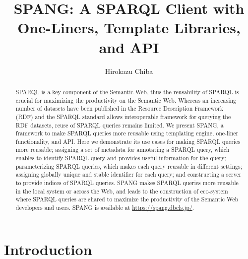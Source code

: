 \documentclass[runningheads]{llncs}
\begin{document}
\title{SPANG: A SPARQL Client with One-Liners, Template Libraries, and API}
\author{Hirokazu Chiba}
%
\maketitle              %
%
\begin{abstract}
SPARQL is a key component of the Semantic Web, thus the reusability of SPARQL is crucial for maximizing the productivity on the Semantic Web.
Whereas an increasing number of datasets have been published in the Resource Description Framework (RDF) and the SPARQL standard allows interoperable framework for querying the RDF datasets, reuse of SPARQL queries remains limited. We present SPANG, a framework to make SPARQL queries more reusable using templating engine, one-liner functionality, and API. Here we demonstrate its use cases for making SPARQL queries more reusable; assigning a set of metadata for annotating a SPARQL query, which enables to identify SPARQL query and provides useful information for the query; parameterizing SPARQL queries, which makes each query reusable in different settings; assigning globally unique and stable identifier for each query; and constructing a server to provide indices of SPARQL queries. SPANG makes SPARQL queries more reusable in the local system or across the Web, and leads to the construction of eco-system where SPARQL queries are shared to maximize the productivity of the Semantic Web developers and users. SPANG is available at \url{https://spang.dbcls.jp/}.


\end{abstract}


\section{Introduction}
\end{document}
